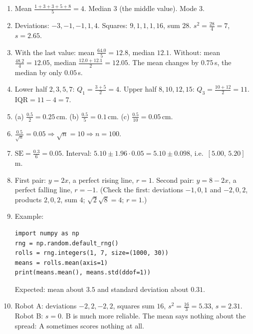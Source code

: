 \begin{enumerate}[label=\textbf{\ansnum.\arabic*}]
  \item Mean $\frac{1+3+3+5+8}{5}=4$. Median $3$ (the middle value). Mode $3$.
  \item Deviations: $-3,-1,-1,1,4$. Squares: $9,1,1,1,16$, sum $28$. $s^2=\frac{28}{4}=7$, $s=2.65$.
  \item With the last value: mean $\frac{64.0}{5}=12.8$, median $12.1$. Without: mean $\frac{48.2}{4}=12.05$, median $\frac{12.0+12.1}{2}=12.05$. The mean changes by $0.75$\,s, the median by only $0.05$\,s.
  \item Lower half $2,3,5,7$: $Q_1=\frac{3+5}{2}=4$. Upper half $8,10,12,15$: $Q_3=\frac{10+12}{2}=11$. $\mathrm{IQR}=11-4=7$.
  \item (a) $\frac{0.5}{2}=0.25$\,cm. (b) $\frac{0.5}{5}=0.1$\,cm. (c) $\frac{0.5}{10}=0.05$\,cm.
  \item $\frac{0.5}{\sqrt n}=0.05\Rightarrow\sqrt n=10\Rightarrow n=100$.
  \item $\mathrm{SE}=\frac{0.3}{6}=0.05$. Interval: $5.10\pm1.96\cdot0.05=5.10\pm0.098$, i.e.\ $[5.00,\,5.20]$ m.
  \item First pair: $y=2x$, a perfect rising line, $r=1$. Second pair: $y=8-2x$, a perfect falling line, $r=-1$. (Check the first: deviations $-1,0,1$ and $-2,0,2$, products $2,0,2$, sum $4$; $\sqrt{2}\sqrt{8}=4$; $r=1$.)
  \item Example:
\begin{verbatim}
import numpy as np
rng = np.random.default_rng()
rolls = rng.integers(1, 7, size=(1000, 30))
means = rolls.mean(axis=1)
print(means.mean(), means.std(ddof=1))
\end{verbatim}
  Expected: mean about $3.5$ and standard deviation about $0.31$.
  \item[\textbf{\ansnum.10}] Robot A: deviations $-2,2,-2,2$, squares sum $16$, $s^2=\frac{16}{3}=5.33$, $s=2.31$. Robot B: $s=0$. B is much more reliable. The mean says nothing about the spread: A sometimes scores nothing at all.
\end{enumerate}
